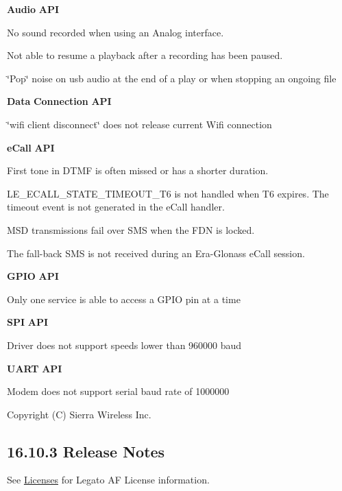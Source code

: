 {\bfseries Audio} {\bfseries A\+PI} 
\begin{DoxyItemize}
\item No sound recorded when using an Analog interface.
\item Not able to resume a playback after a recording has been paused.
\item \char`\"{}\+Pop\char`\"{} noise on {\ttfamily usb} audio at the end of a play or when stopping an ongoing file
\end{DoxyItemize}

{\bfseries Data} {\bfseries Connection} {\bfseries A\+PI} 
\begin{DoxyItemize}
\item \char`\"{}wifi client disconnect\char`\"{} does not release current Wifi connection
\end{DoxyItemize}

{\bfseries e\+Call} {\bfseries A\+PI} 
\begin{DoxyItemize}
\item First tone in D\+T\+MF is often missed or has a shorter duration.
\item {\ttfamily L\+E\+\_\+\+E\+C\+A\+L\+L\+\_\+\+S\+T\+A\+T\+E\+\_\+\+T\+I\+M\+E\+O\+U\+T\+\_\+\+T6} is not handled when T6 expires. The timeout event is not generated in the e\+Call handler.
\item M\+SD transmissions fail over S\+MS when the F\+DN is locked.
\item The fall-\/back S\+MS is not received during an Era-\/\+Glonass e\+Call session.
\end{DoxyItemize}

{\bfseries G\+P\+IO} {\bfseries A\+PI} 
\begin{DoxyItemize}
\item Only one service is able to access a G\+P\+IO pin at a time
\end{DoxyItemize}

{\bfseries S\+PI} {\bfseries A\+PI} 
\begin{DoxyItemize}
\item Driver does not support speeds lower than 960000 baud
\end{DoxyItemize}

{\bfseries U\+A\+RT} {\bfseries A\+PI} 
\begin{DoxyItemize}
\item Modem does not support serial baud rate of 1000000
\end{DoxyItemize}

Copyright (C) Sierra Wireless Inc. \hypertarget{releaseNotes16103}{}\subsection{16.10.3 Release Notes}\label{releaseNotes16103}
See \hyperlink{aboutLicenses}{Licenses} for Legato AF License information.


